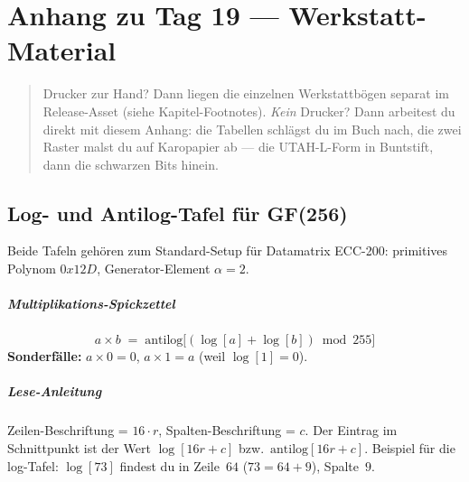 %

\chapter*{Anhang zu Tag 19 — Werkstatt-Material}

\begin{quote}
Drucker zur Hand? Dann liegen die einzelnen Werkstattbögen separat im
Release-Asset (siehe Kapitel-Footnotes). \emph{Kein} Drucker? Dann
arbeitest du direkt mit diesem Anhang: die Tabellen schlägst du im
Buch nach, die zwei Raster malst du auf Karopapier ab — die UTAH-L-Form
in Buntstift, dann die schwarzen Bits hinein.
\end{quote}

\section*{Log- und Antilog-Tafel für GF(256)}

Beide Tafeln gehören zum Standard-Setup für Datamatrix ECC-200:
primitives Polynom $0x12D$, Generator-Element $\alpha = 2$.

\paragraph{Multiplikations-Spickzettel}
\[
  a \times b \;=\; \text{antilog}\!\big[(\log[a] + \log[b]) \bmod 255\big]
\]
\textbf{Sonderfälle:} $a \times 0 = 0$, $a \times 1 = a$ (weil $\log[1]=0$).

\paragraph{Lese-Anleitung}
Zeilen-Beschriftung = $16 \cdot r$, Spalten-Beschriftung = $c$.
Der Eintrag im Schnittpunkt ist der Wert $\log[16r + c]$ bzw.\
$\text{antilog}[16r + c]$. Beispiel für die log-Tafel: $\log[73]$
findest du in Zeile~$64$ ($73 = 64 + 9$), Spalte~$9$.

